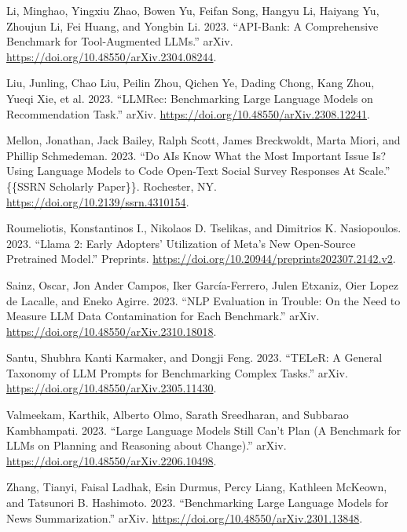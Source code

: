 \documentclass[
  letterpaper,
  DIV=11,
  numbers=noendperiod]{scrartcl}
\newlength{\cslhangindent}
\newlength{\cslentryspacingunit} %
\newenvironment{CSLReferences}[2] %
 {%
  \setlength{\parindent}{0pt}
  \ifodd #1
  \let\oldpar\par
  \def\par{\hangindent=\cslhangindent\oldpar}
  \fi
  \setlength{\parskip}{#2\cslentryspacingunit}
 }%
 {}
\begin{document}
\begin{CSLReferences}{1}{0}
\leavevmode{}%
Li, Minghao, Yingxiu Zhao, Bowen Yu, Feifan Song, Hangyu Li, Haiyang Yu,
Zhoujun Li, Fei Huang, and Yongbin Li. 2023. {``{API-Bank}: {A
Comprehensive Benchmark} for {Tool-Augmented LLMs}.''} {arXiv}.
\url{https://doi.org/10.48550/arXiv.2304.08244}.

\leavevmode{}%
Liu, Junling, Chao Liu, Peilin Zhou, Qichen Ye, Dading Chong, Kang Zhou,
Yueqi Xie, et al. 2023. {``{LLMRec}: {Benchmarking Large Language
Models} on {Recommendation Task}.''} {arXiv}.
\url{https://doi.org/10.48550/arXiv.2308.12241}.

\leavevmode{}%
Mellon, Jonathan, Jack Bailey, Ralph Scott, James Breckwoldt, Marta
Miori, and Phillip Schmedeman. 2023. {``Do {AIs Know What} the {Most
Important Issue} Is? {Using Language Models} to {Code Open-Text Social
Survey Responses At Scale}.''} \{\{SSRN Scholarly Paper\}\}. {Rochester,
NY}. \url{https://doi.org/10.2139/ssrn.4310154}.

\leavevmode{}%
Roumeliotis, Konstantinos I., Nikolaos D. Tselikas, and Dimitrios K.
Nasiopoulos. 2023. {``Llama 2: {Early Adopters}' {Utilization} of
{Meta}'s {New Open-Source Pretrained Model}.''} {Preprints}.
\url{https://doi.org/10.20944/preprints202307.2142.v2}.

\leavevmode{}%
Sainz, Oscar, Jon Ander Campos, Iker García-Ferrero, Julen Etxaniz, Oier
Lopez de Lacalle, and Eneko Agirre. 2023. {``{NLP Evaluation} in
Trouble: {On} the {Need} to {Measure LLM Data Contamination} for Each
{Benchmark}.''} {arXiv}.
\url{https://doi.org/10.48550/arXiv.2310.18018}.

\leavevmode{}%
Santu, Shubhra Kanti Karmaker, and Dongji Feng. 2023. {``{TELeR}: {A
General Taxonomy} of {LLM Prompts} for {Benchmarking Complex Tasks}.''}
{arXiv}. \url{https://doi.org/10.48550/arXiv.2305.11430}.

\leavevmode{}%
Valmeekam, Karthik, Alberto Olmo, Sarath Sreedharan, and Subbarao
Kambhampati. 2023. {``Large {Language Models Still Can}'t {Plan} ({A
Benchmark} for {LLMs} on {Planning} and {Reasoning} about {Change}).''}
{arXiv}. \url{https://doi.org/10.48550/arXiv.2206.10498}.

\leavevmode{}%
Zhang, Tianyi, Faisal Ladhak, Esin Durmus, Percy Liang, Kathleen
McKeown, and Tatsunori B. Hashimoto. 2023. {``Benchmarking {Large
Language Models} for {News Summarization}.''} {arXiv}.
\url{https://doi.org/10.48550/arXiv.2301.13848}.

\end{CSLReferences}
\end{document}
